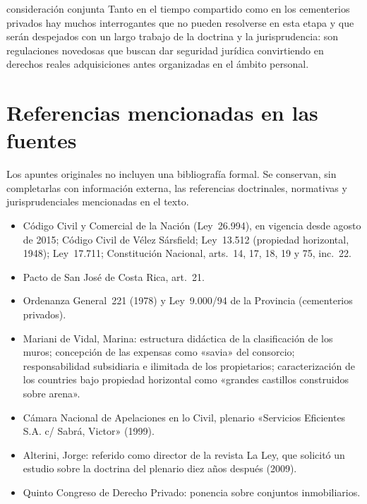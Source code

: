 \documentclass[12pt,oneside]{book}
\begin{document}
\begin{conceptoclave}{consideración conjunta}
Tanto en el tiempo compartido como en los cementerios privados hay muchos interrogantes que no pueden resolverse en esta etapa y que serán despejados con un largo trabajo de la doctrina y la jurisprudencia: son regulaciones novedosas que buscan dar seguridad jurídica convirtiendo en derechos reales adquisiciones antes organizadas en el ámbito personal.
\end{conceptoclave}

\backmatter

\chapter*{Referencias mencionadas en las fuentes}

Los apuntes originales no incluyen una bibliografía formal. Se conservan, sin completarlas con información externa, las referencias doctrinales, normativas y jurisprudenciales mencionadas en el texto.

\begin{itemize}
    \item Código Civil y Comercial de la Nación (Ley~26.994), en vigencia desde agosto de 2015; Código Civil de Vélez Sársfield; Ley~13.512 (propiedad horizontal, 1948); Ley~17.711; Constitución Nacional, arts.~14, 17, 18, 19 y 75, inc.~22.
    \item Pacto de San José de Costa Rica, art.~21.
    \item Ordenanza General~221 (1978) y Ley~9.000/94 de la Provincia (cementerios privados).
    \item Mariani de Vidal, Marina: estructura didáctica de la clasificación de los muros; concepción de las expensas como «savia» del consorcio; responsabilidad subsidiaria e ilimitada de los propietarios; caracterización de los countries bajo propiedad horizontal como «grandes castillos construidos sobre arena».
    \item Cámara Nacional de Apelaciones en lo Civil, plenario «Servicios Eficientes S.A. c/ Sabrá, Victor» (1999).
    \item Alterini, Jorge: referido como director de la revista La Ley, que solicitó un estudio sobre la doctrina del plenario diez años después (2009).
    \item Quinto Congreso de Derecho Privado: ponencia sobre conjuntos inmobiliarios.
\end{itemize}
\end{document}
